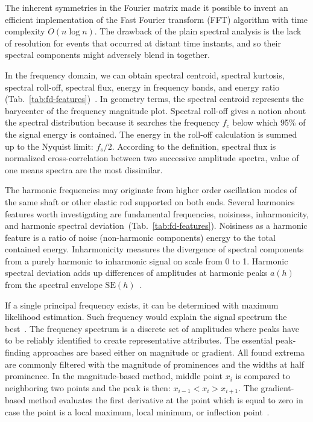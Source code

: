 The inherent symmetries in the Fourier matrix made it possible to invent an efficient implementation of the Fast Fourier transform (FFT) algorithm with time complexity $O(n \log n)$. The drawback of the plain spectral analysis is the lack of resolution for events that occurred at distant time instants, and so their spectral components might adversely blend in together. 

In the frequency domain, we can obtain spectral centroid, spectral kurtosis, spectral roll-off, spectral flux, energy in frequency bands, and energy ratio (Tab.~\ref{tab:fd-features})~\cite{peeters_large_2004}. In geometry terms, the spectral centroid represents the barycenter of the frequency magnitude plot. Spectral roll-off gives a notion about the spectral distribution because it searches the frequency $f_c$ below which 95\% of the signal energy is contained. The energy in the roll-off calculation is summed up to the Nyquist limit: $f_s / 2$. According to the definition, spectral flux is normalized cross-correlation between two successive amplitude spectra, value of one means spectra are the most dissimilar.

The harmonic frequencies may originate from higher order oscillation modes of the same shaft or other elastic rod supported on both ends. Several harmonics features worth investigating are fundamental frequencies, noisiness, inharmonicity, and harmonic spectral deviation~(Tab.~\ref{tab:fd-features}). Noisiness as a harmonic feature is a ratio of noise (non-harmonic components) energy to the total contained energy. Inharmonicity measures the divergence of spectral components from a purely harmonic to inharmonic signal on scale from 0 to 1. Harmonic spectral deviation adds up differences of amplitudes at harmonic peaks $a(h)$ from the spectral envelope $\mathrm{SE}(h)$~\cite{peeters_large_2004}. 

If a single principal frequency exists, it can be determined with maximum likelihood estimation. Such frequency would explain the signal spectrum the best~\cite{peeters_large_2004}.  The frequency spectrum is a discrete set of amplitudes where peaks have to be reliably identified to create representative attributes.
The essential peak-finding approaches are based either on magnitude or gradient. All found extrema are commonly filtered with the magnitude of prominences and the widths at half prominence. In the magnitude-based method, middle point $x_i$ is compared to neighboring two points and the peak is then: $x_{i-1} < x_i > x_{i+1}$. The gradient-based method evaluates the first derivative at the point which is equal to zero in case the point is a local maximum, local minimum, or inflection point~\cite{adikaram_non-parametric_2016}.

